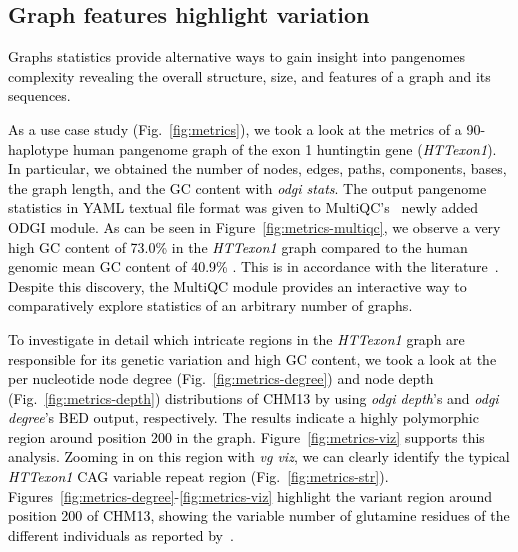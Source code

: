 \documentclass{bioinfo}
\newcommand{\REVIEWED}[1]{{\textcolor{Black}{#1}}}
\begin{document}


\subsection{Graph features highlight variation}
\label{sec:metrics}

\REVIEWED{Graphs statistics provide alternative ways to gain insight into pangenomes complexity revealing the overall structure, size, and features of a graph and its sequences.}

\REVIEWED{As a use case study (Fig.~\ref{fig:metrics}), we took a look at the metrics of a 90-haplotype human pangenome graph of the exon 1 huntingtin gene (\textit{HTTexon1}). In particular, we obtained the number of nodes, edges, paths, components, bases, the graph length, and the GC content with \textit{odgi stats}. The output pangenome statistics in YAML textual file format was given to
MultiQC's~\citep{Ewels_2016} newly added ODGI module. As can be seen in Figure~\ref{fig:metrics-multiqc}, we observe a very high GC content of 73.0\% in the \textit{HTTexon1} graph compared to the human genomic mean GC content of 40.9\% \citep{Piovesan2019}. This is in accordance with the literature~\citep{Neueder2017}. %
Despite this discovery, the MultiQC module provides an interactive way to comparatively explore statistics of an arbitrary number of graphs.}

\REVIEWED{To investigate in detail which intricate regions in the \textit{HTTexon1} graph are responsible for its genetic variation and high GC content, we took a look at the per nucleotide node degree (Fig.~\ref{fig:metrics-degree}) and node depth (Fig.~\ref{fig:metrics-depth}) distributions of CHM13 by using \textit{odgi depth}'s and \textit{odgi degree}'s BED output, respectively.
The results indicate a highly polymorphic region around position 200 in the graph.
Figure~\ref{fig:metrics-viz} supports this analysis. Zooming in on this region with \textit{vg viz}, we can clearly identify the typical \textit{HTTexon1} CAG variable repeat region (Fig.~\ref{fig:metrics-str}).
Figures~\ref{fig:metrics-degree}-\ref{fig:metrics-viz} highlight the variant region around position 200 of CHM13, showing the variable number of glutamine residues of the different individuals as reported by~\citep{Nance1999}.}
\end{document}
